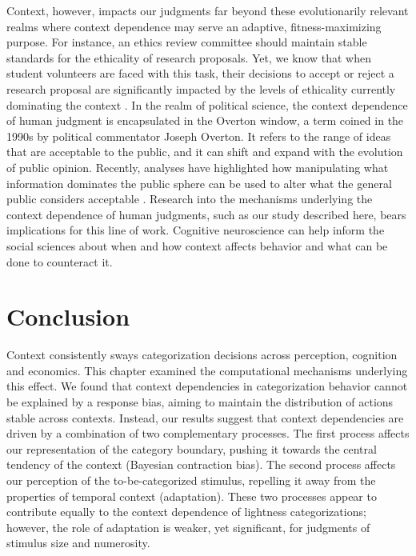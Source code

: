 \documentclass[a4paper, nobind]{templates/ociamthesis}
\begin{document}
Context, however, impacts our judgments far beyond these evolutionarily relevant realms where context dependence may serve an adaptive, fitness-maximizing purpose. For instance, an ethics review committee should maintain stable standards for the ethicality of research proposals. Yet, we know that when student volunteers are faced with this task, their decisions to accept or reject a research proposal are significantly impacted by the levels of ethicality currently dominating the context \autocite{levari2018}. In the realm of political science, the context dependence of human judgment is encapsulated in the Overton window, a term coined in the 1990s by political commentator Joseph Overton. It refers to the range of ideas that are acceptable to the public, and it can shift and expand with the evolution of public opinion. Recently, analyses have highlighted how manipulating what information dominates the public sphere can be used to alter what the general public considers acceptable \autocite{greenhill2018,bobric2021}. Research into the mechanisms underlying the context dependence of human judgments, such as our study described here, bears implications for this line of work. Cognitive neuroscience can help inform the social sciences about when and how context affects behavior and what can be done to counteract it.

\hypertarget{conclusion-2}{%
\section{Conclusion}\label{conclusion-2}}

Context consistently sways categorization decisions across perception, cognition and economics. This chapter examined the computational mechanisms underlying this effect. We found that context dependencies in categorization behavior cannot be explained by a response bias, aiming to maintain the distribution of actions stable across contexts. Instead, our results suggest that context dependencies are driven by a combination of two complementary processes. The first process affects our representation of the category boundary, pushing it towards the central tendency of the context (Bayesian contraction bias). The second process affects our perception of the to-be-categorized stimulus, repelling it away from the properties of temporal context (adaptation). These two processes appear to contribute equally to the context dependence of lightness categorizations; however, the role of adaptation is weaker, yet significant, for judgments of stimulus size and numerosity.
\end{document}
